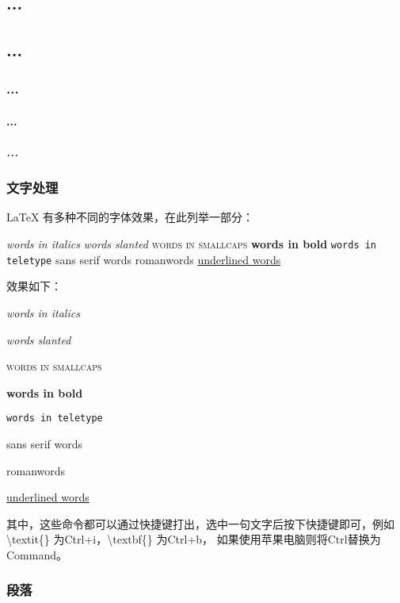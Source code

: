 \begin{python}
\part{...}
\chapter{...}
\section{...}
\subsection{...}
\subsubsection{...}
\end{python}

\section{文字处理}

LaTeX 有多种不同的字体效果，在此列举一部分：

\begin{python}
\textit{words in italics} 
\textsl{words slanted} 
\textsc{words in smallcaps} 
\textbf{words in bold} 
\texttt{words in teletype} 
\textsf{sans serif words} 
\textrm{romanwords} 
\underline{underlined words}
\end{python}

效果如下：

\textit{words in italics} 

\textsl{words slanted} 

\textsc{words in smallcaps} 

\textbf{words in bold} 

\texttt{words in teletype} 

\textsf{sans serif words} 

\textrm{romanwords} 

\underline{underlined words}

其中，这些命令都可以通过快捷键打出，选中一句文字后按下快捷键即可，例如\textbackslash textit\{\} 为Ctrl+i，\textbackslash textbf\{\} 为Ctrl+b，
如果使用苹果电脑则将Ctrl替换为Command。

\section{段落}

